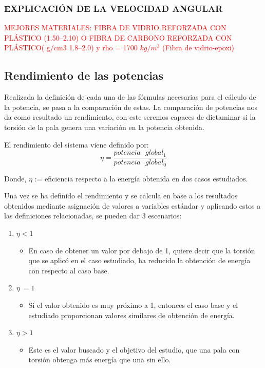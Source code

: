  
\subsubsection{EXPLICACIÓN DE LA VELOCIDAD ANGULAR}

 
 
 
\textcolor{red}{\Large{MEJORES MATERIALES: FIBRA DE VIDRIO REFORZADA CON PLÁSTICO (1.50–2.10) O FIBRA DE CARBONO REFORZADA CON PLÁSTICO( g/cm3	1.8–2.0) y rho = 1700 $kg/m^3$ (Fibra de vidrio-epoxi) }}
 
 
 \subsection{Rendimiento de las potencias}
 \label{section:rendimiento}
 
Realizada la definición de cada una de las fórmulas necesarias para el cálculo de la potencia, se pasa a la comparación de estas. La comparación de potencias nos da como resultado un rendimiento, con este seremos capaces de dictaminar si la torsión de la pala genera una variación en la potencia obtenida.
 
   \begin{definicion}
El rendimiento del sistema viene definido por:
 $$ \eta = \dfrac{potencia \text{ } global_1}{potencia \text{ } global_0} $$ 
 
 Donde,
  \centering $\eta$ := eficiencia respecto a la energía obtenida en dos casos estudiados.
 \label{def:rendimiento_potencias}
 \end{definicion}
 
 Una vez se ha definido el rendimiento y se calcula en base a los resultados obtenidos mediante asignación de valores a variables estándar y aplicando estos a las definiciones relacionadas, se pueden dar 3 escenarios:
 

\begin{enumerate}
    \item $\eta < 1$
        \begin{itemize}
            \item En caso de obtener un valor por debajo de 1, quiere decir que la torsión que se aplicó en el caso estudiado, ha reducido la obtención de energía con respecto al caso base. 
        \end{itemize}
    \item $\eta ~= 1$
        \begin{itemize}
            \item Si el valor obtenido es muy próximo a 1, entonces el caso base y el estudiado proporcionan valores similares de obtención de energía.
        \end{itemize}
    \item $\eta > 1$
        \begin{itemize}
            \item Este es el valor buscado y el objetivo del estudio, que una pala con torsión obtenga más energía que una sin ello.
        \end{itemize}
\end{enumerate}

